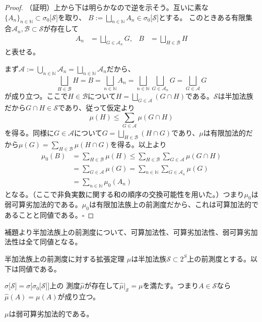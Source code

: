 \documentclass[../root.tex]{subfiles}
\begin{document}
\begin{proof}
（証明）上から下は明らかなので逆を示そう。互いに素な$ \lbrace A_{n} \rbrace_{n\in\mathbb{N}}\subset\sigma_{0}\lbrack \mathscr{S} \rbrack $を取り、
$ B:=\bigsqcup_{n\in\mathbb{N}}A_{n}\in\sigma_{0}\lbrack \mathscr{S} \rbrack $とする。
このときある有限集合$ \mathscr{A}_{n}, \mathscr{B}\subset\mathscr{S} $が存在して
\begin{align*}
A_{n}&=\bigsqcup_{G\in\mathscr{A}_{n}}G, & B&=\bigsqcup_{H\in\mathscr{B}}H
\end{align*}
と表せる。

まず$ \mathscr{A}:=\bigcup_{n\in\mathbb{N}}\mathscr{A}_{n}=\bigsqcup_{n\in\mathbb{N}}\mathscr{A}_{n} $だから、
\[ \bigsqcup_{H\in\mathscr{B}}H=B=\bigsqcup_{n\in\mathbb{N}}A_{n}=\bigsqcup_{n\in\mathbb{N}}\bigsqcup_{G\in\mathscr{A}_{n}}G=\bigsqcup_{G\in\mathscr{A}}G \]
が成り立つ。ここで$ H\in\mathscr{B} $について$ H=\bigsqcup_{G\in\mathscr{A}}( G\cap H ) $である。$ \mathscr{S} $は半加法族だから$ G\cap H\in\mathscr{S} $であり、従って仮定より
\[ \mu( H )\le\sum_{G\in\mathscr{A}}\mu( G\cap H ) \]
を得る。同様に$ G\in\mathscr{A} $について$ G=\bigsqcup_{H\in\mathscr{B}}( H\cap G ) $であり、$ \mu $は有限加法的だから$ \mu( G )=\sum_{H\in\mathscr{B}}\mu( H\cap G ) $を得る。以上より
\begin{align*}
\mu_{0}( B )&=\sum_{H\in\mathscr{B}}\mu( H )\le\sum_{H\in\mathscr{B}}\sum_{G\in\mathscr{A}}\mu( G\cap H ) \\
&=\sum_{G\in\mathscr{A}}\mu( G )=\sum_{n\in\mathbb{N}}\sum_{G\in\mathscr{A}_{n}}\mu( G ) \\
&=\sum_{n\in\mathbb{N}}\mu_{0}( A_{n} )
\end{align*}
となる。（ここで非負実数に関する和の順序の交換可能性を用いた。）つまり$ \mu_{0} $は弱可算劣加法的である。$ \mu_{0} $は有限加法族上の前測度だから、これは可算加法的であることと同値である。$ \square $
\end{proof}

補題より半加法族上の前測度について、可算加法性、可算劣加法性、弱可算劣加法性は全て同値となる。

\begin{Thm}{半加法族上の前測度に対する拡張定理}{}
$ \mu $は半加法族$ \mathscr{S}\subset 2^{S} $上の前測度とする。以下は同値である。
\begin{EnumEquiv}
\item $ \sigma\lbrack \mathscr{S} \rbrack=\sigma\lbrack \sigma_{0}\lbrack \mathscr{S} \rbrack \rbrack $上の
測度$ \widehat{\mu} $が存在して$ \widehat{\mu}|_{\mathscr{S}}=\mu $を満たす。つまり$ A\in\mathscr{S} $なら$ \widehat{\mu}( A )=\mu( A ) $が成り立つ。
\item $ \mu $は弱可算劣加法的である。
\end{EnumEquiv}
\end{Thm}
\end{document}
